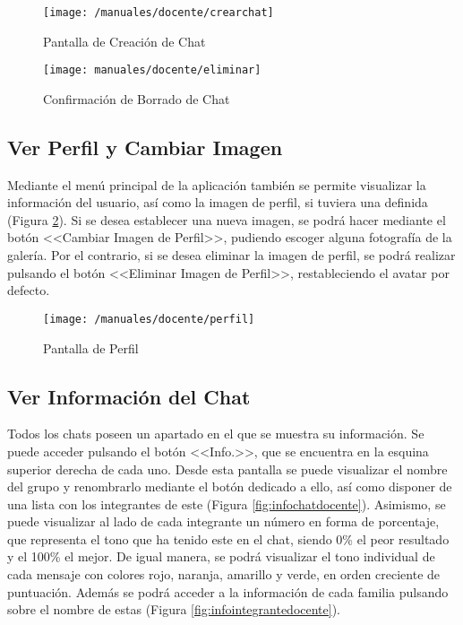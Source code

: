 \begin{figure}[!h]
	\centering
	\begin{minipage}{.5\textwidth}
		\centering
		\texttt{[image: /manuales/docente/crearchat]}
		\caption{Pantalla de Creación de Chat}
		\label{fig:crearchat}
	\end{minipage}%
	\begin{minipage}{.5\textwidth}
		\centering
		\texttt{[image: manuales/docente/eliminar]}
		\caption{Confirmación de Borrado de Chat}
		\label{fig:eliminarchat}
	\end{minipage}
\end{figure}

\clearpage

\subsection*{Ver Perfil y Cambiar Imagen}
Mediante el menú principal de la aplicación también se permite visualizar la información del usuario, así como la imagen de perfil, si tuviera una definida (Figura \ref{fig:perfildocente}). Si se desea establecer una nueva imagen, se podrá hacer mediante el botón <<Cambiar Imagen de Perfil>>, pudiendo escoger alguna fotografía de la galería. Por el contrario, si se desea eliminar la imagen de perfil, se podrá realizar pulsando el botón <<Eliminar Imagen de Perfil>>, restableciendo el avatar por defecto.

\begin{figure}[!h]
	\begin{center}
		\texttt{[image: /manuales/docente/perfil]}
		\caption{Pantalla de Perfil}
		\label{fig:perfildocente}
	\end{center}
\end{figure}

\clearpage

\subsection*{Ver Información del Chat}
Todos los chats poseen un apartado en el que se muestra su información. Se puede acceder pulsando el botón <<Info.>>, que se encuentra en la esquina superior derecha de cada uno. Desde esta pantalla se puede visualizar el nombre del grupo y renombrarlo mediante el botón dedicado a ello, así como disponer de una lista con los integrantes de este (Figura \ref{fig:infochatdocente}). Asimismo, se puede visualizar al lado de cada integrante un número en forma de porcentaje, que representa el tono que ha tenido este en el chat, siendo 0\% el peor resultado y el 100\% el mejor. De igual manera, se podrá visualizar el tono individual de cada mensaje con colores rojo, naranja, amarillo y verde, en orden creciente de puntuación. Además se podrá acceder a la información de cada familia pulsando sobre el nombre de estas (Figura \ref{fig:infointegrantedocente}).

